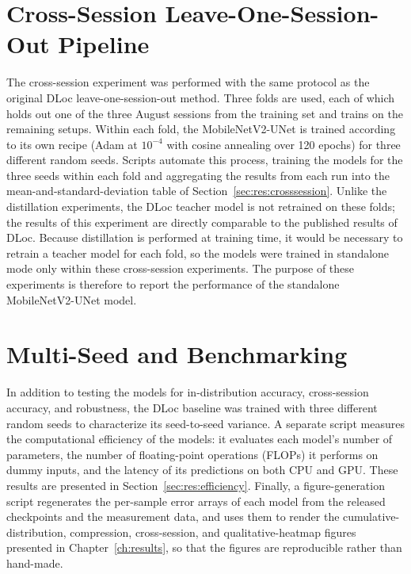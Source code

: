 \section{Cross-Session Leave-One-Session-Out Pipeline}
\label{sec:impl:crosssession}

The cross-session experiment was performed with the same protocol as the original DLoc
leave-one-session-out method. Three folds are used, each of which holds out one of the three August
sessions from the training set and trains on the remaining setups. Within each fold, the MobileNetV2-UNet
is trained according to its own recipe (Adam at $10^{-4}$ with cosine annealing over 120 epochs) for
three different random seeds. Scripts automate this process, training the models for the three seeds
within each fold and aggregating the results from each run into the mean-and-standard-deviation table of
Section~\ref{sec:res:crosssession}. Unlike the distillation experiments, the DLoc teacher model is not
retrained on these folds; the results of this experiment are directly comparable to the published results
of DLoc. Because distillation is performed at training time, it would be necessary to retrain a teacher
model for each fold, so the models were trained in standalone mode only within these cross-session
experiments. The purpose of these experiments is therefore to report the performance of the standalone
MobileNetV2-UNet model.

\section{Multi-Seed and Benchmarking}
\label{sec:impl:benchmark}

In addition to testing the models for in-distribution accuracy, cross-session accuracy, and robustness,
the DLoc baseline was trained with three different random seeds to characterize its seed-to-seed
variance. A separate script measures the computational efficiency of the models: it evaluates each
model's number of parameters, the number of floating-point operations (FLOPs) it performs on dummy
inputs, and the latency of its predictions on both CPU and GPU. These results are presented in
Section~\ref{sec:res:efficiency}. Finally, a figure-generation script regenerates the per-sample error
arrays of each model from the released checkpoints and the measurement data, and uses them to render the
cumulative-distribution, compression, cross-session, and qualitative-heatmap figures presented in
Chapter~\ref{ch:results}, so that the figures are reproducible rather than hand-made.
